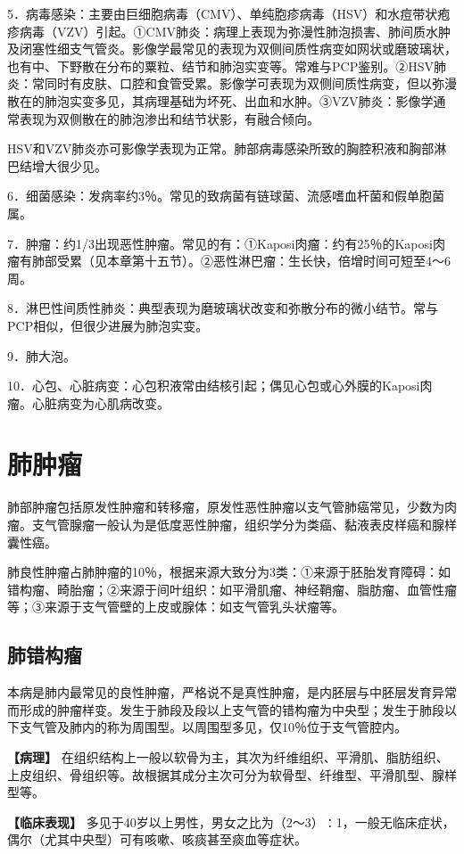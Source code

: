 5．病毒感染：主要由巨细胞病毒（CMV）、单纯胞疹病毒（HSV）和水痘带状疱疹病毒（VZV）引起。①CMV肺炎：病理上表现为弥漫性肺泡损害、肺间质水肿及闭塞性细支气管炎。影像学最常见的表现为双侧间质性病变如网状或磨玻璃状，也有中、下野散在分布的粟粒、结节和肺泡实变等。常难与PCP鉴别。②HSV肺炎：常同时有皮肤、口腔和食管受累。影像学可表现为双侧间质性病变，但以弥漫散在的肺泡实变多见，其病理基础为坏死、出血和水肿。③VZV肺炎：影像学通常表现为双侧散在的肺泡渗出和结节状影，有融合倾向。

HSV和VZV肺炎亦可影像学表现为正常。肺部病毒感染所致的胸腔积液和胸部淋巴结增大很少见。

6．细菌感染：发病率约3％。常见的致病菌有链球菌、流感嗜血杆菌和假单胞菌属。

7．肿瘤：约1/3出现恶性肿瘤。常见的有：①Kaposi肉瘤：约有25％的Kaposi肉瘤有肺部受累（见本章第十五节）。②恶性淋巴瘤：生长快，倍增时间可短至4～6周。

8．淋巴性间质性肺炎：典型表现为磨玻璃状改变和弥散分布的微小结节。常与PCP相似，但很少进展为肺泡实变。

9．肺大泡。

10．心包、心脏病变：心包积液常由结核引起；偶见心包或心外膜的Kaposi肉瘤。心脏病变为心肌病改变。

\section{肺肿瘤}

肺部肿瘤包括原发性肿瘤和转移瘤，原发性恶性肿瘤以支气管肺癌常见，少数为肉瘤。支气管腺瘤一般认为是低度恶性肿瘤，组织学分为类癌、黏液表皮样癌和腺样囊性癌。

肺良性肿瘤占肺肿瘤的10％，根据来源大致分为3类：①来源于胚胎发育障碍：如错构瘤、畸胎瘤；②来源于间叶组织：如平滑肌瘤、神经鞘瘤、脂肪瘤、血管性瘤等；③来源于支气管壁的上皮或腺体：如支气管乳头状瘤等。

\subsection{肺错构瘤}

本病是肺内最常见的良性肿瘤，严格说不是真性肿瘤，是内胚层与中胚层发育异常而形成的肿瘤样变。发生于肺段及段以上支气管的错构瘤为中央型；发生于肺段以下支气管及肺内的称为周围型。以周围型多见，仅10％位于支气管腔内。

\textbf{【病理】}
在组织结构上一般以软骨为主，其次为纤维组织、平滑肌、脂肪组织、上皮组织、骨组织等。故根据其成分主次可分为软骨型、纤维型、平滑肌型、腺样型等。

\textbf{【临床表现】}
多见于40岁以上男性，男女之比为（2～3）∶1，一般无临床症状，偶尔（尤其中央型）可有咳嗽、咳痰甚至痰血等症状。

